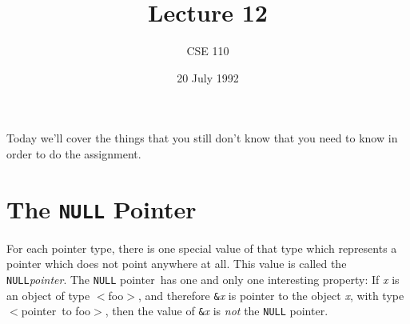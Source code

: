 %
%
%
 

\def\brac#1{$<$#1$>$}
\def\Int{{\tt int}}
\def\int{\brac{\Int}}
\def\int{\brac{\Int}}
\def\Shortint{{\tt short~int}}
\def\shortint{\brac{\Shortint}}
\def\Longint{{\tt long~int}}
\def\longint{\brac{\Longint}}
\def\Float{{\tt float}}
\def\float{\brac{\Float}}
\def\Double{{\tt double}}
\def\double{\brac{\Double}}
\def\Char{{\tt char}}
\def\chr{\brac{\Char}}
\def\Void{{\tt void}}
\def\void{\brac{\Void}}

\def\ptr#1{pointer~to #1}
\def\p2#1{\brac{\ptr#1}}
\def\Ano#1#2{array~of {#1}~#2s}
\def\ano#1#2{\brac{\Ano#1#2}}
\def\Ao#1{array~of #1}
\def\ao#1{\brac{\Ao#1}}

\def\np{{\tt NULL} pointer}

\def\breakhere{\mbox{$\otimes$}}
\parskip 8pt


\title{Lecture 12}
\author{CSE 110}
\date{20 July 1992}

\pagestyle{fancy}
\rhead{\thepage}
\cfoot{}





\maketitle

Today we'll cover the things that you still don't know that you need to
know in order to do the assignment.

\section{The {\tt NULL} Pointer}

For each pointer type, there is one special value of that type which
represents a pointer which does not point anywhere at all.  This value
is called the {\tt NULL}{\em pointer}\/.  The \np\ has one and only one
interesting property:  If {\em x}\/ is an object of type \brac{foo},
and therefore {\tt\&}{\em x}\/ is pointer to the object {\em x}\/, with
type \p2{foo}, then the value of {\tt\&}{\em x}\/ is {\em not} the \np.

